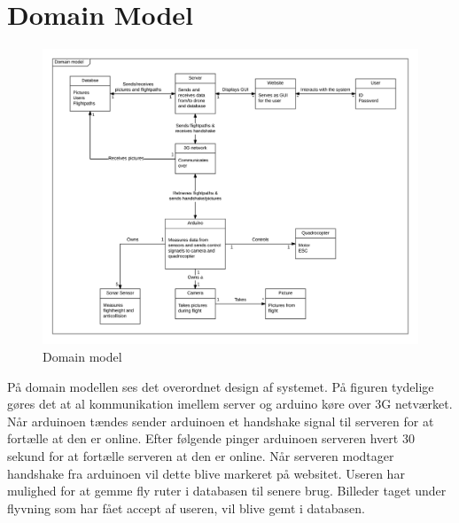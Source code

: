 \chapter{Domain Model}

\vspace{-5pt}
\begin{figure}[H]
	\centering
	\includegraphics[width=1.1\textwidth]{Billeder/domain_model.png}
	\vspace{-5pt}
	\caption{Domain model}
	\label{fig:domain_model}
\end{figure}

På domain modellen ses det overordnet design af systemet. På figuren tydelige gøres det at al kommunikation imellem server og arduino køre over 3G netværket. Når arduinoen tændes sender arduinoen et handshake signal til serveren for at fortælle at den er online. Efter følgende pinger arduinoen serveren hvert 30 sekund for at fortælle serveren at den er online. Når serveren modtager handshake fra arduinoen vil dette blive markeret på websitet. Useren har mulighed for at gemme fly ruter i databasen til senere brug. Billeder taget under flyvning som har fået accept af useren, vil blive gemt i databasen.